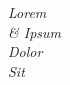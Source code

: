 \newcommand*{\halftitle}{\begingroup
    \raggedleft
    \vspace*{8\baselineskip}
    {\itshape Lorem\\[3\baselineskip]\& Ipsum\\[3\baselineskip]Dolor\\[3\baselineskip]Sit}
    \thispagestyle{empty}
    \cleardoublepage
\endgroup}

\halftitle